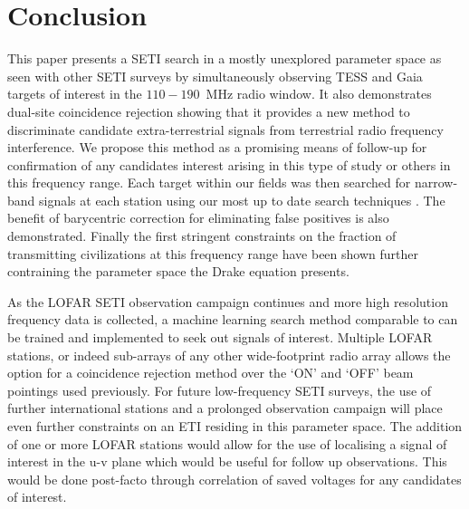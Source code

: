 \section{Conclusion}\label{sec:conclusion}

This paper presents a SETI search in a mostly unexplored parameter space as seen with other SETI surveys \citep{Gajjar_2021_BLGC1, Price:2018bv} by simultaneously observing TESS and Gaia targets of interest in the $110-190$~MHz radio window. It also demonstrates dual-site coincidence rejection showing that it provides a new method to discriminate candidate extra-terrestrial signals from terrestrial radio frequency interference. We propose this method as a promising means of follow-up for confirmation of any candidates interest arising in this type of study or others in this frequency range. Each target within our fields was then searched for narrow-band signals at each station using our most up to date search techniques \citep{Enriquez:2017}. The benefit of barycentric correction for eliminating false positives is also demonstrated. Finally the first stringent constraints on the fraction of transmitting civilizations at this frequency range have been shown further contraining the parameter space the Drake equation presents.   

As the LOFAR SETI observation campaign continues and more high resolution frequency data is collected, a machine learning search method comparable to \cite{BLSETI_ML_2023} can be trained and implemented to seek out signals of interest. Multiple LOFAR stations, or indeed sub-arrays of any other wide-footprint radio array allows the option for a coincidence rejection method over the `ON' and `OFF' beam pointings used previously. For future low-frequency SETI surveys, the use of further international stations and a prolonged observation campaign will place even further constraints on an ETI residing in this parameter space. The addition of one or more LOFAR stations would allow for the use of localising a signal of interest in the u-v plane which would be useful for follow up observations. This would be done post-facto through correlation of saved voltages for any candidates of interest.
